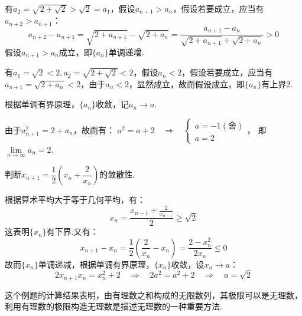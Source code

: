 \begin{solution}
    有$a_2 = \sqrt{2 + \sqrt{2}} > \sqrt{2} = a_1$，假设$a_{n+1}>a_n$，假设若要成立，应当有$a_{n+2}>a_{n+1}$：
    \[a_{n+2} - a_{n+1} = \sqrt{2+a_{n+1}} - \sqrt{2+a_n} = \frac{a_{n+1}-a_n}{\sqrt{2+a_{n+1}} + \sqrt{2+a_n}} > 0\]
    假设$a_{n+1}>a_n$成立，即$\{a_n\}$单调递增.

    有$a_1=\sqrt{2}<2, a_2=\sqrt{2+\sqrt{2}}<2$，假设$a_n < 2$，假设若要成立，应当有$a_{n+1} = \sqrt{2+a_n}<2$，由于$a_n<2$，显然成立，故而假设成立，即$\{a_n\}$有上界$2$.

    根据单调有界原理，$\{a_n\}$收敛，记$a_n \to a$.

    由于$a_{n+1}^2 = 2+a_n$，故而有：
    $a^2 = a+2 \quad\Rightarrow\quad \begin{cases}
        a = -1(\text{舍})\\
        a = 2
    \end{cases}$，
    即$\lim\limits_{n \to \infty}a_n = 2$.
\end{solution}

\begin{question}
    判断$x_{n+1} = \dfrac{1}{2}\left(x_n+\dfrac{2}{x_n}\right)$的敛散性.
\end{question}

\begin{solution}
    根据算术平均大于等于几何平均，有：
    \[x_n = \frac{x_{n-1}+\frac{2}{x_{n-1}}}{2} \geqslant \sqrt{2}\]
    这表明$\{x_n\}$有下界.又有：
    \[x_{n+1} - x_n = \frac{1}{2}\left(\frac{2}{x_n}-x_n\right) = \frac{2-x_n^2}{2x_n} \leqslant 0\]
    故而$\{x_n\}$单调递减，根据单调有界原理，$\{x_n\}$收敛，设$x_n \to a$：
    \[2x_{n+1}x_n = x_n^2 + 2 \quad\Rightarrow\quad 2a^2=a^2+2 \quad\Rightarrow\quad a=\sqrt{2}\]
\end{solution}
这个例题的计算结果表明，由有理数之和构成的无限数列，其极限可以是无理数，利用有理数的极限构造无理数是描述无理数的一种重要方法.

